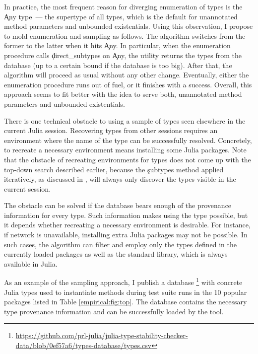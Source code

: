 \begin{enumerate}
In practice, the most frequent reason for diverging enumeration of types
is the \c{Any} type~--- the supertype of all types, which is the default for
unannotated method parameters and unbounded existentials. Using this
observation, I propose to mold enumeration and sampling as follows. The
algorithm switches from the former to the latter when it hits \c{Any}.
In particular, when the enumeration procedure calls
\c{direct\_subtypes} on \c{Any}, the utility returns the types from the database
(up to a certain bound if the database is too big).
After that, the algorithm will proceed as usual without any other change.
Eventually, either the enumeration procedure runs out
of fuel, or it finishes with a success. Overall, this approach seems to fit better
with the idea to serve both, unannotated method parameters and unbounded
existentials.

\end{enumerate}

There is one technical obstacle to using a sample of types seen elsewhere
in the current Julia session. Recovering types from
other sessions requires an environment where the name of the type can be
successfully resolved. Concretely, to recreate a necessary environment means
installing some Julia packages.
Note that the obstacle of recreating environments for types does not come up
with the top-down search described earlier, because the \c{subtypes} method
applied iteratively, as discussed in , will always only
discover the types visible in the current session.

The obstacle can be solved if the database bears enough
of the provenance information for every type. Such information makes using the
type possible, but %
it depends whether recreating a necessary environment is desirable.
For instance, if network is unavailable, installing extra Julia packages 
may not be possible.
In such cases, the algorithm can filter and
employ only the types defined in the currently loaded packages as well as 
the standard library, which is always available in Julia.

As an example of the sampling approach, I publish a database%
\footnote{%
  \url{https://github.com/prl-julia/julia-type-stability-checker-data/blob/0ef57a6/types-database/types.csv}}
with concrete Julia types used to instantiate methods during test suite runs in
the 10 popular packages listed in Table \ref{empirical:fig:top}. The database
contains the necessary type provenance information and can be successfully
loaded by the tool.

